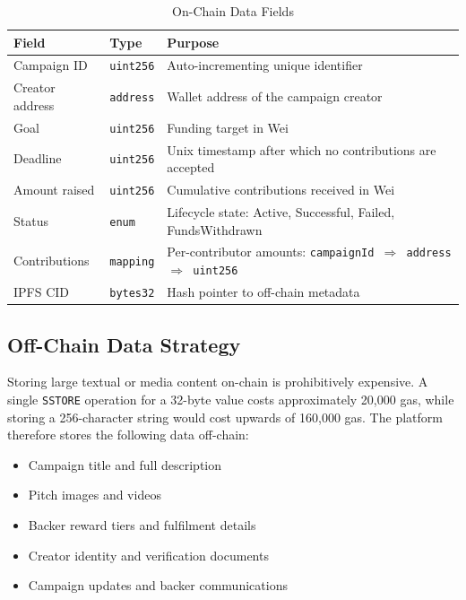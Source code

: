 \begin{table}[H]
\centering
\caption{On-Chain Data Fields}
\label{tab:onchain}
\begin{tabularx}{\textwidth}{l l X}
\toprule
\textbf{Field} & \textbf{Type} & \textbf{Purpose} \\
\midrule
Campaign ID        & \texttt{uint256}    & Auto-incrementing unique identifier \\
Creator address    & \texttt{address}    & Wallet address of the campaign creator \\
Goal               & \texttt{uint256}    & Funding target in Wei \\
Deadline           & \texttt{uint256}    & Unix timestamp after which no contributions are accepted \\
Amount raised      & \texttt{uint256}    & Cumulative contributions received in Wei \\
Status             & \texttt{enum}       & Lifecycle state: Active, Successful, Failed, FundsWithdrawn \\
Contributions      & \texttt{mapping}    & Per-contributor amounts: \texttt{campaignId $\Rightarrow$ address $\Rightarrow$ uint256} \\
IPFS CID           & \texttt{bytes32}    & Hash pointer to off-chain metadata \\
\bottomrule
\end{tabularx}
\end{table}

\subsection{Off-Chain Data Strategy}

Storing large textual or media content on-chain is prohibitively expensive. A single \texttt{SSTORE} operation for a 32-byte value costs approximately 20,000 gas, while storing a 256-character string would cost upwards of 160,000 gas. The platform therefore stores the following data off-chain:

\begin{itemize}[leftmargin=1.5em]
    \item Campaign title and full description
    \item Pitch images and videos
    \item Backer reward tiers and fulfilment details
    \item Creator identity and verification documents
    \item Campaign updates and backer communications
\end{itemize}

